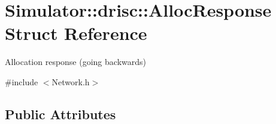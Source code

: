 \hypertarget{struct_simulator_1_1drisc_1_1_alloc_response}{\section{Simulator\+:\+:drisc\+:\+:Alloc\+Response Struct Reference}
\label{struct_simulator_1_1drisc_1_1_alloc_response}
}


Allocation response (going backwards)  




{\ttfamily \#include $<$Network.\+h$>$}

\subsection*{Public Attributes}
